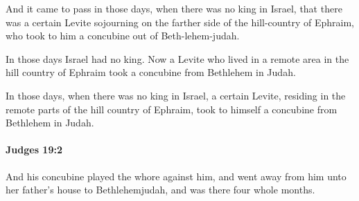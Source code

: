 			\begin{versebox}
					\item[BHS] 
					\item[ASV] And it came to pass in those days, when there was no king in Israel, that there was a certain Levite sojourning on the farther side of the hill-country of Ephraim, who took to him a concubine out of Beth-lehem-judah.
					\item[NIV] In those days Israel had no king. Now a Levite who lived in a remote area in the hill country of Ephraim took a concubine from Bethlehem in Judah.
					\item[NRSV] In those days, when there was no king in Israel, a certain Levite, residing in the remote parts of the hill country of Ephraim, took to himself a concubine from Bethlehem in Judah.
			\end{versebox}

		\paragraph{Judges 19:2} %
			\label{JUDGES-19-2}

			And his concubine played the whore against him, and went away from him unto her father’s house to Bethlehemjudah, and was there four whole months.

